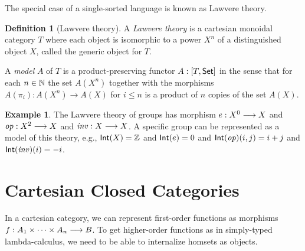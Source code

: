 \documentclass[a4paper,fleqn]{scrartcl}
\theoremstyle{definition}
\newtheorem{definition}{Definition}
\newtheorem{example}{Example}
\begin{document}
The special case of a single-sorted language is known as Lawvere theory.

\begin{definition}[Lawvere theory]
  A \emph{Lawvere theory} is a cartesian monoidal category $T$ where
  each object is isomorphic to a power $X^n$ of a distinguished object
  $X$, called the generic object for $T$.

  A \emph{model} $A$ of $T$ is a product-preserving functor $A : [T,\mathsf{Set}]$
  in the sense that for each $n \in \mathbb{N}$ the set $A(X^{n})$ together
  with the morphisms $A(\pi_{i}) : A(X^{n}) \rightarrow A(X)$ for $i
  \leq n$ is a product of $n$ copies of the set $A(X)$.
\end{definition}
\begin{example}
  The Lawvere theory of groups has morphism $e : X^0 \longrightarrow X$ and
  $\mathit{op} : X^2 \longrightarrow X$ and $\mathit{inv} : X \longrightarrow X$.  A specific group can be
  represented as a model of this theory, e.g., $\mathsf{Int}(X) = \mathbb{Z}$ and
  $\mathsf{Int}(e) = 0$ and $\mathsf{Int}(\mathit{op})(i,j) = i + j$ and $\mathsf{Int}(\mathit{inv})(i) = -i$.
\end{example}

\section{Cartesian Closed Categories}

In a cartesian category, we can represent first-order functions as
morphisms $f : A_1 \times \dots \times A_n \longrightarrow B$.  To get
higher-order functions as in simply-typed lambda-calculus, we need to
be able to internalize homsets as objects.
\end{document}
